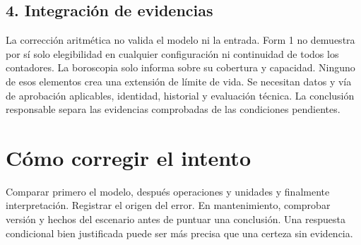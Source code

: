 \section{4. Integración de evidencias}
La corrección aritmética no valida el modelo ni la entrada. Form 1 no demuestra por sí solo elegibilidad en cualquier configuración ni continuidad de todos los contadores. La boroscopia solo informa sobre su cobertura y capacidad. Ninguno de esos elementos crea una extensión de límite de vida. Se necesitan datos y vía de aprobación aplicables, identidad, historial y evaluación técnica. La conclusión responsable separa las evidencias comprobadas de las condiciones pendientes.





\backmatter\chapter*{Cómo corregir el intento}Comparar primero el modelo, después operaciones y unidades y finalmente interpretación. Registrar el origen del error. En mantenimiento, comprobar versión y hechos del escenario antes de puntuar una conclusión. Una respuesta condicional bien justificada puede ser más precisa que una certeza sin evidencia.